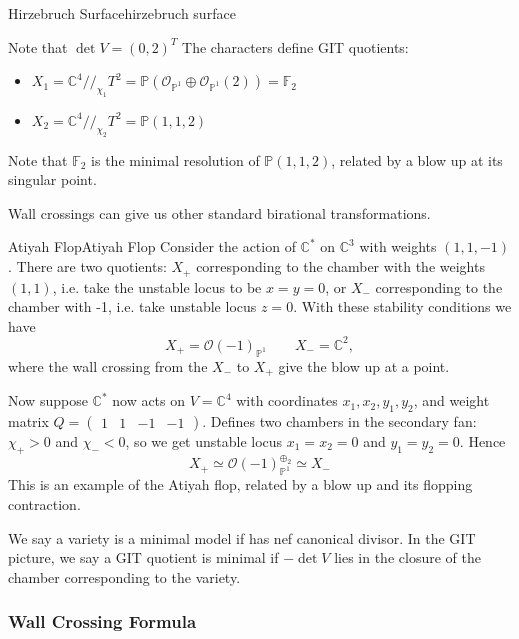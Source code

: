\begin{example}{Hirzebruch Surface}{hirzebruch surface}
\begin{centering}
\begin{tikzpicture}[x=0.75pt,y=0.75pt,yscale=-1,xscale=1]
	
\end{tikzpicture}
	
\end{centering}


Note that $\det V=(0,2)^T$
The characters define GIT quotients: 
\begin{itemize}
	\item  $X_{1}= \mathbb{C}^{4}//_{\chi_{1}}T^{2}= \mathbb{P}(\mathcal{O}_{\mathbb{P}^{1}}\oplus \mathcal{O}_{\mathbb{P}^{1}}(2)) = \mathbb{F}_2$
	\item  $X_{2}= \mathbb{C}^{4}//_{\chi_{2}}T^{2}= \mathbb{P}(1,1,2)$
\end{itemize}

Note that $\mathbb{F}_2$ is the minimal resolution of $\mathbb{P}(1,1,2)$, related by a blow up at its singular point.
\end{example}

Wall crossings can give us other standard birational transformations.

\begin{example}{Atiyah Flop}{Atiyah Flop}
Consider the action of $\mathbb{C}^{*}$ on $\mathbb{C}^3$ with weights $(1,1,-1)$. 
There are two quotients: $X_+$ corresponding to the chamber with the weights $(1,1)$, i.e. take the unstable locus to be $x=y= 0$, or $X_-$ corresponding to the chamber with -1, i.e. take unstable locus $z = 0$. With these stability conditions we have $$
X_{+}= \mathcal{O}(-1)_{\mathbb{P}^{1}} \qquad X_{-}= \mathbb{C}^2, $$ where the wall crossing from the $X_-$ to $X_+$ give the blow up at a point. 

Now suppose $\mathbb{C}^*$ now acts on $V = \mathbb{C}^4$  with coordinates $x_{1}, x_{2}, y_{1},y_{2}$, and weight matrix $Q = \begin{pmatrix}1&1&-1&-1\end{pmatrix}$. 
Defines two chambers in the secondary fan: $\chi_{+}>0$ and $\chi_{-}<0$, so we get unstable locus $x_{1}= x_{2}= 0$ and $y_{1}= y_{2}=0$. Hence $$
X_{+}\simeq \mathcal{O}(-1)_{\mathbb{P}^{1}}^{\oplus_{2}}\simeq X_-
$$This is an example of the Atiyah flop, related by a blow up and its flopping contraction. 
\end{example}

We say a variety is a minimal model if has nef canonical divisor. In the GIT picture, we say a GIT quotient is minimal if $-\det V$ lies in the closure of the chamber corresponding to the variety. 

\subsubsection{Wall Crossing Formula}

